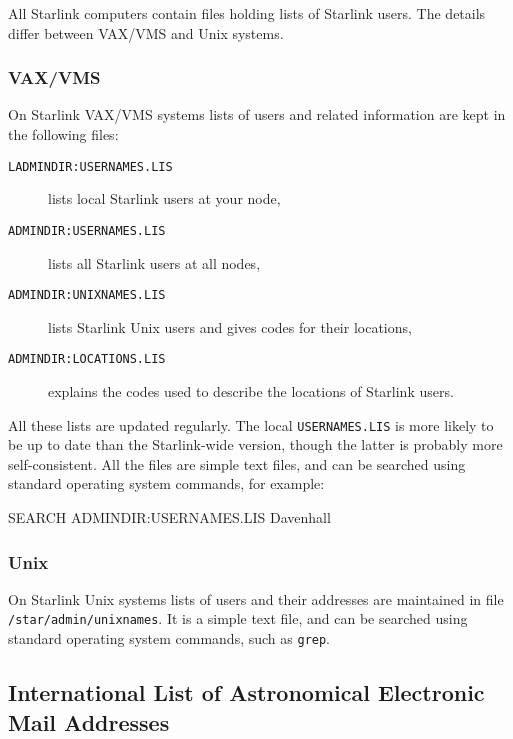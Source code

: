 \documentclass[twoside,11pt,nolof]{starlink}
\begin{document}
All Starlink computers contain files holding lists of Starlink users.
The details differ between VAX/VMS and Unix systems.

\subsubsection{VAX/VMS}

On Starlink VAX/VMS systems lists of users and related information are
kept in the following files:

\begin{description}

  \item[\texttt{LADMINDIR:USERNAMES.LIS}] lists local Starlink users at
   your node,

  \item[\texttt{ADMINDIR:USERNAMES.LIS}] lists all Starlink users at all
   nodes,

  \item[\texttt{ADMINDIR:UNIXNAMES.LIS}] lists Starlink Unix users and
   gives codes for their locations,

  \item[\texttt{ADMINDIR:LOCATIONS.LIS}] explains the codes used to
   describe the locations of Starlink users.

\end{description}

All these lists are updated regularly. The local \texttt{USERNAMES.LIS} is
more likely to be up to date than the Starlink-wide version, though the
latter is probably more self-consistent. All the files are simple text
files, and can be searched using standard operating system commands,
for example:

\begin{terminalv}
SEARCH  ADMINDIR:USERNAMES.LIS  Davenhall
\end{terminalv}

\subsubsection{Unix}

On Starlink Unix systems lists of users and their addresses are
maintained in file
\newline \texttt{/star/admin/unixnames}. It is a simple text file, and
can be searched using standard operating system commands, such as \texttt{grep}.

\subsection{International List of Astronomical Electronic Mail Addresses
\label{EMAIL}}
\end{document}
